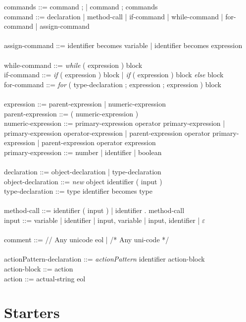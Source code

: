 commands ::= command ; | command ; commands\\
command ::= declaration | method-call | if-command | while-command | for-command | assign-command\\
\\
assign-command ::= identifier becomes  variable | identifier becomes expression\\
\\
while-command ::= \textit{while} ( expression ) block\\
if-command ::= \textit{if} ( expression ) block | \textit{if} ( expression ) block \textit{else} block\\
for-command ::= \textit{for} ( type-declaration ; expression ; expression ) block\\
\\
expression ::= parent-expression | numeric-expression\\
parent-expression ::= ( numeric-expression )\\
numeric-expression ::= primary-expression operator primary-expression | primary-expression operator-expression | parent-expression operator primary-expression | parent-expression operator expression\\
primary-expression ::= number | identifier | boolean\\
\\
declaration ::= object-declaration | type-declaration\\
object-declaration ::= \textit{new} object identifier ( input ) \\
type-declaration ::= type identifier becomes type\\
\\
method-call ::= identifier ( input ) | identifier . method-call\\
input ::= variable | identifier | input, variable | input, identifier | $\varepsilon$ \\
\\
comment ::= // Any unicode eol | /* Any uni-code */\\
\\
actionPattern-declaration ::= \textit{actionPattern} identifier action-block\\
action-block ::= { action }\\
action ::= actual-string eol


\section{Starters}
\label{ap:starters}

